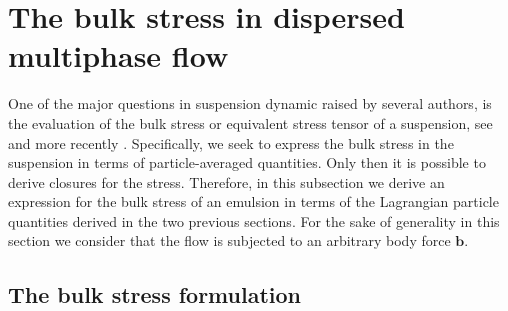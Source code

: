 

\section{The bulk stress in dispersed multiphase flow}
\label{sec:symetric_stress}


One of the major questions in suspension dynamic raised by several authors, is the evaluation of the bulk stress or equivalent stress tensor of a suspension, see \citep{batchelor1970stress, prosperetti2006stress,zhang1997momentum,nadim1996concise} and more recently \citet{dolata2020heterogeneous}. 
Specifically, we seek to express the bulk stress in the suspension in terms of particle-averaged quantities. 
Only then it is possible to derive closures for the stress. 
Therefore, in this subsection we derive an expression for the bulk stress of an emulsion in terms of the Lagrangian particle quantities derived in the two previous sections. 
For the sake of generality in this section we consider that the flow is subjected to an arbitrary body force $\textbf{b}$. 

\subsection{The bulk stress formulation}

